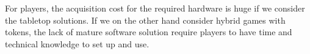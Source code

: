 For players, the acquisition cost for the required hardware is huge if we consider the tabletop solutions. If we on the other hand consider hybrid games with tokens, the lack of mature software solution require players to have time and technical knowledge to set up and use.



%
%
%
%
%
%
